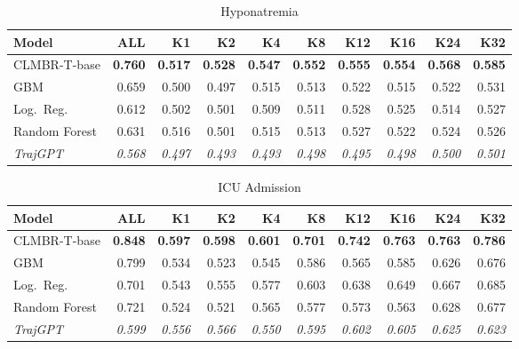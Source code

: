 \documentclass{article}
\newcommand{\B}[1]{\textbf{#1}}
\newcommand{\IT}[1]{\textit{#1}}
\begin{document}
\begin{table}[ht]
\centering\caption{Hyponatremia}
\begin{tabular}{l *{9}{r}}
\toprule
\textbf{Model} & \textbf{ALL} & \textbf{K1} & \textbf{K2} & \textbf{K4} & \textbf{K8} & \textbf{K12} & \textbf{K16} & \textbf{K24} & \textbf{K32} \\
\midrule
CLMBR-T-base  & \B{0.760} & \B{0.517} & \B{0.528} & \B{0.547} & \B{0.552} & \B{0.555} & \B{0.554} & \B{0.568} & \B{0.585} \\
GBM           & 0.659     & 0.500     & 0.497     & 0.515     & 0.513     & 0.522     & 0.515     & 0.522     & 0.531     \\
Log.\ Reg.    & 0.612     & 0.502     & 0.501     & 0.509     & 0.511     & 0.528     & 0.525     & 0.514     & 0.527     \\
Random Forest & 0.631     & 0.516     & 0.501     & 0.515     & 0.513     & 0.527     & 0.522     & 0.524     & 0.526     \\
\IT{TrajGPT}  & \IT{0.568} & \IT{0.497} & \IT{0.493} & \IT{0.493} & \IT{0.498} & \IT{0.495} & \IT{0.498} & \IT{0.500} & \IT{0.501} \\
\bottomrule
\end{tabular}
\end{table}

\begin{table}[ht]
\centering\caption{ICU Admission}
\begin{tabular}{l *{9}{r}}
\toprule
\textbf{Model} & \textbf{ALL} & \textbf{K1} & \textbf{K2} & \textbf{K4} & \textbf{K8} & \textbf{K12} & \textbf{K16} & \textbf{K24} & \textbf{K32} \\
\midrule
CLMBR-T-base  & \B{0.848} & \B{0.597} & \B{0.598} & \B{0.601} & \B{0.701} & \B{0.742} & \B{0.763} & \B{0.763} & \B{0.786} \\
GBM           & 0.799     & 0.534     & 0.523     & 0.545     & 0.586     & 0.565     & 0.585     & 0.626     & 0.676     \\
Log.\ Reg.    & 0.701     & 0.543     & 0.555     & 0.577     & 0.603     & 0.638     & 0.649     & 0.667     & 0.685     \\
Random Forest & 0.721     & 0.524     & 0.521     & 0.565     & 0.577     & 0.573     & 0.563     & 0.628     & 0.677     \\
\IT{TrajGPT}  & \IT{0.599} & \IT{0.556} & \IT{0.566} & \IT{0.550} & \IT{0.595} & \IT{0.602} & \IT{0.605} & \IT{0.625} & \IT{0.623} \\
\bottomrule
\end{tabular}
\end{table}
\end{document}
